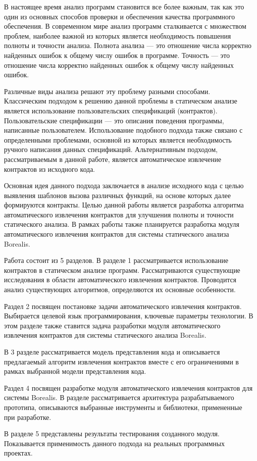 \intro
В настоящее время анализ программ становится все более важным, так как это один из основных способов проверки и обеспечения качества программного обеспечения. В современном мире анализ программ сталкивается с множеством проблем, наиболее важной из которых является необходимость повышения полноты и точности анализа. Полнота анализа --- это отношение числа корректно найденных ошибок к общему числу ошибок в программе. Точность --- это отношение числа корректно найденных ошибок к общему числу найденных ошибок.

Различные виды анализа решают эту проблему разными способами. Классическим подходом к решению данной проблемы в статическом анализе является использование пользовательских спецификаций (контрактов). Пользовательские спецификации --- это описания поведения программы, написанные пользователем. Использование подобного подхода также связано с определенными проблемами, основной из которых является необходимость ручного написания данных спецификаций. Альтернативным подходом, рассматриваемым в данной работе, является автоматическое извлечение контрактов из исходного кода.

Основная идея данного подхода заключается в анализе исходного кода с целью выявления шаблонов вызова различных функций, на основе которых далее формируются контракты. Целью данной работы является разработка алгоритма автоматического извлечения контрактов для улучшения полноты и точности статического анализа. В рамках работы также планируется разработка модуля автоматического извлечения контрактов для системы статического анализа Borealis\cite{borealis}.

Работа состоит из 5 разделов. В разделе 1 рассматривается использование контрактов в статическом анализе программ. Рассматриваются существующие исследования в области автоматического извлечения контрактов. Проводится анализ существующих алгоритмов, определяются их основные особенности.

Раздел 2 посвящен постановке задачи автоматического извлечения контрактов. Выбирается целевой язык программирования, ключевые параметры технологии. В этом разделе также ставится задача разработки модуля автоматического извлечения контрактов для системы статического анализа Borealis.

В 3 разделе рассматривается модель представления кода и описывается предлагаемый алгоритм извлечения контрактов вместе с его ограничениями в рамках выбранной модели представления кода.

Раздел 4 посвящен разработке модуля автоматического извлечения контрактов для системы Borealis. В разделе рассматривается архитектура разрабатываемого прототипа, описываются выбранные инструменты и библиотеки, примененные при разработке.

В разделе 5 представлены результаты тестирования созданного модуля. Показывается применимость данного подхода на реальных программных проектах.

